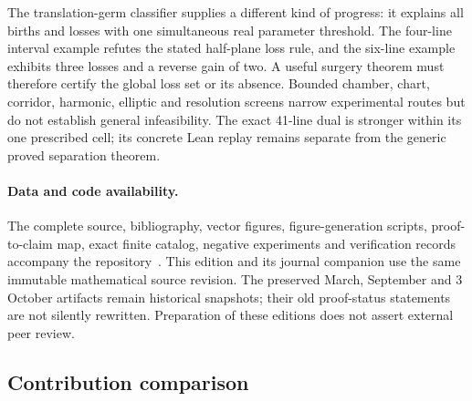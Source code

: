 The translation-germ classifier supplies a different kind of progress:
it explains all births and losses with one simultaneous real parameter
threshold. The four-line interval example refutes the stated half-plane
loss rule, and the six-line example exhibits three losses and a reverse
gain of two. A useful surgery theorem must therefore certify the global
loss set or its absence. Bounded chamber, chart, corridor, harmonic,
elliptic and resolution screens narrow experimental routes but do not
establish general infeasibility. The exact 41-line dual is stronger
within its one prescribed cell; its concrete Lean replay remains separate
from the generic proved separation theorem.

\paragraph{Data and code availability.}
The complete source, bibliography, vector figures, figure-generation
scripts, proof-to-claim map, exact finite catalog, negative experiments
and verification records accompany the repository~\cite{zarzueloRepository}.
This edition and its journal companion use the same immutable mathematical
source revision. The preserved March, September and 3 October artifacts
remain historical snapshots; their old proof-status statements are not
silently rewritten. Preparation of these editions does not assert
external peer review.

\subsection{Contribution comparison}

